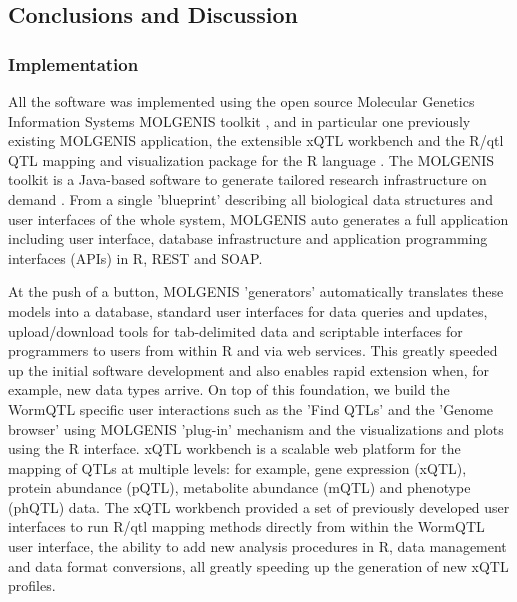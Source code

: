 \subsection{Conclusions and Discussion}
\subsubsection{Implementation}
All the software was implemented using the open source Molecular Genetics Information Systems 
MOLGENIS toolkit \cite{Swertz:2010a}, and in particular one previously existing MOLGENIS application, the 
extensible xQTL workbench \cite{Arends:2012} and the R/qtl QTL mapping and visualization package for the R 
language \cite{Broman:2003, Arends:2010}. The MOLGENIS toolkit is a Java-based software to generate tailored research 
infrastructure on demand \cite{Swertz:2007}. From a single 'blueprint' describing all biological data 
structures and user interfaces of the whole system, MOLGENIS auto generates a full application 
including user interface, database infrastructure and application programming interfaces 
(APIs) in R, REST and SOAP.

At the push of a button, MOLGENIS 'generators' automatically translates these models into a 
database, standard user interfaces for data queries and updates, upload/download tools for 
tab-delimited data and scriptable interfaces for programmers to users from within R and via 
web services. This greatly speeded up the initial software development and also enables rapid 
extension when, for example, new data types arrive. On top of this foundation, we build the 
WormQTL specific user interactions such as the 'Find QTLs' and the 'Genome browser' using 
MOLGENIS 'plug-in' mechanism and the visualizations and plots using the R interface. xQTL 
workbench is a scalable web platform for the mapping of QTLs at multiple levels: for example, 
gene expression (xQTL), protein abundance (pQTL), metabolite abundance (mQTL) and phenotype 
(phQTL) data. The xQTL workbench provided a set of previously developed user interfaces to 
run R/qtl mapping methods directly from within the WormQTL user interface, the ability to 
add new analysis procedures in R, data management and data format conversions, all greatly 
speeding up the generation of new xQTL profiles.

